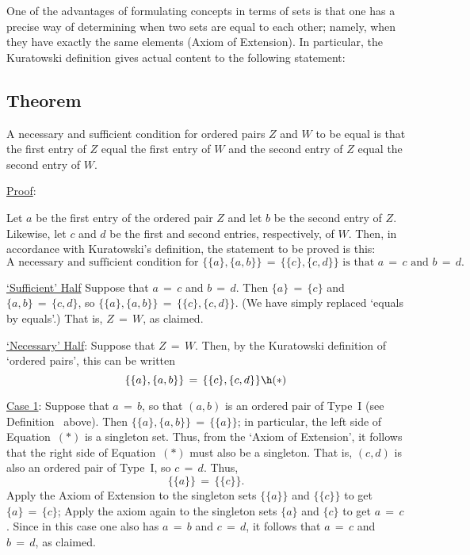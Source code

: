 \V
\V

        One of the advantages of formulating concepts in terms of sets is that one has a precise way of determining when two sets are equal to each other; namely, when they have exactly the same elements (Axiom of Extension).
    In particular, the Kuratowski definition gives actual content to the following statement:


        \subsection{\small{\bf Theorem}}
            \label{ThmA12.20}

        A necessary and sufficient condition for ordered pairs $Z$ and $W$ to be equal is that the first entry of $Z$ equal the first entry of $W$ and the second entry of $Z$ equal the second entry of $W$.

\V

        \underline{Proof}:

        Let $a$ be the first entry of the ordered pair $Z$ and let $b$ be the second entry of $Z$.
    Likewise, let $c$ and $d$ be the first and second entries, respectively, of $W$.
    Then, in accordance with Kuratowski's definition, the statement to be proved is this:
        \begin{displaymath}
        \mbox{A necessary and sufficient condition for } \{\{a\},\{a,b\}\} \,=\, \{\{c\},\{c,d\}\} \mbox{ is that }
    a \,=\, c \mbox{ and } b \,=\, d.
        \end{displaymath}

        \underline{`Sufficient' Half} Suppose that $a \,=\, c$ and $b \,=\, d$.
    Then $\{a\} \,=\, \{c\}$ and $\{a,b\} \,=\, \{c,d\}$, so $\{\{a\}, \{a,b\}\} \,=\, \{\{c\},\{c,d\}\}$.
    (We have simply replaced `equals by equals'.) That is, $Z \,=\, W$, as claimed.

\V

        \underline{`Necessary' Half}: Suppose that $Z \,=\, W$.
    Then, by the Kuratowski definition of `ordered pairs', this can be written
        \begin{displaymath}
        \{\{a\},\{a,b\}\} \,=\, \{\{c\},\{c,d\}\} \h ({\ast})
        \end{displaymath}

        \underline{Case 1}: Suppose that $a \,=\, b$, so that $(a,b)$ is an ordered pair of Type~I (see Definition~ above).
    Then $\{\{a\},\{a,b\}\} \,=\, \{\{a\}\}$; in particular, the left side of Equation~$({\ast})$ is a singleton set.
    Thus, from the `Axiom of Extension', it follows that the right side of Equation~$({\ast})$ must also be a singleton.
    That is, $(c,d)$ is also an ordered pair of Type~I, so $c \,=\, d$.
    Thus,
        \begin{displaymath}
        \{\{a\}\} \,=\, \{\{c\}\}.
        \end{displaymath}
    Apply the Axiom of Extension to the singleton sets $\{\{a\}\}$ and $\{\{c\}\}$ to get $\{a\} \,=\, \{c\}$;
    Apply the axiom again to the singleton sets $\{a\}$ and $\{c\}$ to get $a \,=\, c$.
    Since in this case one also has $a \,=\, b$ and $c \,=\, d$, it follows that $a \,=\, c$ and $b \,=\, d$, as claimed.

